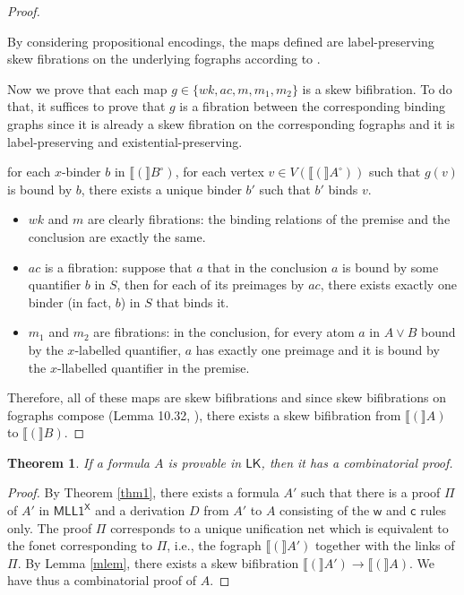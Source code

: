 \documentclass[conference,twosided,10pt]{IEEEtran}
\newtheorem{theorem_}[thm]{Theorem}
\theoremstyle{definition}
\newcommand*{\LK}{\mathsf{LK}}
\newcommand*{\FOMLL}{\mathsf{MLL1^X}}
\renewcommand\wD {\mathsf{w}}
\renewcommand\cD {\mathsf{c}}
\newcommand{\cor}{\vee}
\newcommand{\PE}[1]{#1^\circ}
\newcommand{\graphof}[1]{\llbracket#1\rrbracket}
\begin{document}
\begin{proof}
\begin{itemize}
\end{itemize}

By considering propositional encodings, the maps defined are label-preserving
skew fibrations on the underlying fographs according to
\cite{str:07:RTA}.

Now we prove that each map $g \in \{wk, ac, m, m_1, m_2 \}$ is a skew bifibration. To do that, it suffices to prove that $g$ is a fibration between the corresponding binding graphs since it is already a skew fibration on the corresponding fographs and it is label-preserving and existential-preserving.
\begin{center}
for each $x$-binder $b$ in $\graphof(\PE{B})$, for each vertex $v \in V(\graphof(\PE{A}))$
such that $g(v)$ is bound by $b$, there exists a unique binder $b'$ such
that $b'$ binds $v$.
\end{center}

\begin{itemize}
  \item $wk$ and $m$ are clearly fibrations: the binding relations of the premise and the conclusion are exactly the same.
  \item $ac$ is a fibration: suppose that $a$ that in the conclusion $a$ is bound by some quantifier $b$ in $S$, then for each of its preimages by $ac$, there exists exactly one binder (in fact, $b$) in $S$ that binds it.
  \item $m_1$ and $m_2$ are fibrations: in the conclusion, for every atom $a$ in $A \cor B$ bound by the $x$-labelled quantifier, $a$ has exactly one preimage and it is bound by the $x$-llabelled quantifier in the premise.
\end{itemize}

  Therefore, all of these maps are skew bifibrations and since skew bifibrations
on fographs compose (Lemma 10.32, \cite{hughes:fopws}), there exists a skew
bifibration from $\graphof(A)$ to $\graphof(B)$.

\end{proof}

\begin{theorem_}
If a formula $A$ is provable in $\LK$, then it has a combinatorial proof.
\end{theorem_}

\begin{proof}
By Theorem \ref{thm1}, there exists a formula $A'$ such that there is a proof
$\Pi$ of $A'$ in $\FOMLL$ and a derivation $D$ from $A'$ to $A$ consisting of
the $\wD$ and $\cD$ rules only. The proof $\Pi$ corresponds to a unique
unification net which is equivalent to the fonet corresponding to $\Pi$, i.e.,
the fograph $\graphof(A')$ together with the links of $\Pi$. By Lemma \ref{mlem}, 
there exists a skew bifibration $\graphof(A') \rightarrow \graphof(A)$. We have thus a
combinatorial proof of $A$.

\end{proof}
\end{document}
